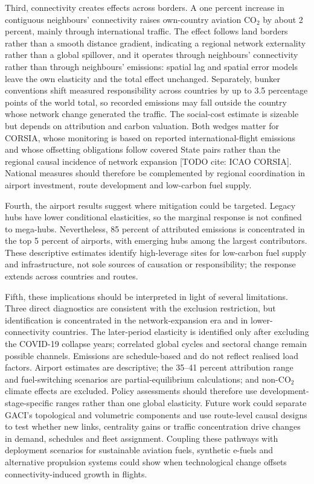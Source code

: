 \documentclass[12pt]{article}
\begin{document}
Third, connectivity creates effects across borders. A one percent increase in contiguous neighbours' connectivity raises own-country aviation CO$_2$ by about 2 percent, mainly through international traffic. The effect follows land borders rather than a smooth distance gradient, indicating a regional network externality rather than a global spillover, and it operates through neighbours' connectivity rather than through neighbours' emissions: spatial lag and spatial error models leave the own elasticity and the total effect unchanged. Separately, bunker conventions shift measured responsibility across countries by up to 3.5 percentage points of the world total, so recorded emissions may fall outside the country whose network change generated the traffic. The social-cost estimate is sizeable but depends on attribution and carbon valuation. Both wedges matter for CORSIA, whose monitoring is based on reported international-flight emissions and whose offsetting obligations follow covered State pairs rather than the regional causal incidence of network expansion [TODO cite: ICAO CORSIA]. National measures should therefore be complemented by regional coordination in airport investment, route development and low-carbon fuel supply.

Fourth, the airport results suggest where mitigation could be targeted. Legacy hubs have lower conditional elasticities, so the marginal response is not confined to mega-hubs. Nevertheless, 85 percent of attributed emissions is concentrated in the top 5 percent of airports, with emerging hubs among the largest contributors. These descriptive estimates identify high-leverage sites for low-carbon fuel supply and infrastructure, not sole sources of causation or responsibility; the response extends across countries and routes.

Fifth, these implications should be interpreted in light of several limitations. Three direct diagnostics are consistent with the exclusion restriction, but identification is concentrated in the network-expansion era and in lower-connectivity countries. The later-period elasticity is identified only after excluding the COVID-19 collapse years; correlated global cycles and sectoral change remain possible channels. Emissions are schedule-based and do not reflect realised load factors. Airport estimates are descriptive; the 35--41 percent attribution range and fuel-switching scenarios are partial-equilibrium calculations; and non-CO$_2$ climate effects are excluded. Policy assessments should therefore use development-stage-specific ranges rather than one global elasticity. Future work could separate GACI's topological and volumetric components and use route-level causal designs to test whether new links, centrality gains or traffic concentration drive changes in demand, schedules and fleet assignment. Coupling these pathways with deployment scenarios for sustainable aviation fuels, synthetic e-fuels and alternative propulsion systems could show when technological change offsets connectivity-induced growth in flights.
\end{document}
